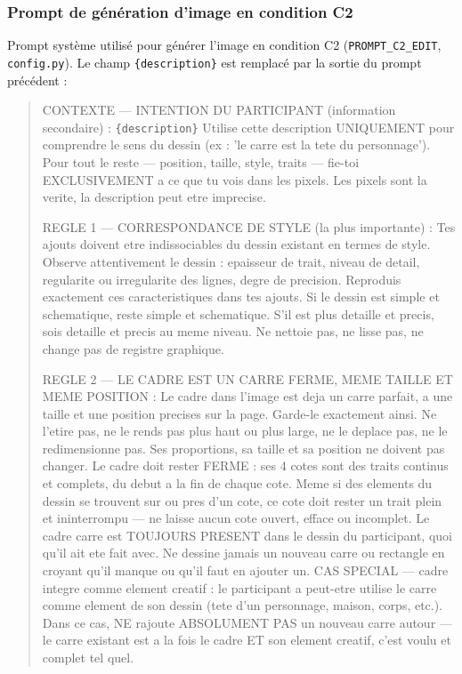 \documentclass[11pt]{article}
\begin{document}
\subsubsection{Prompt de génération d'image en condition C2}
\label{annexe:prompt_c2}

Prompt système utilisé pour générer l'image en condition C2 (\texttt{PROMPT\_C2\_EDIT}, \texttt{config.py}). Le champ \texttt{\{description\}} est remplacé par la sortie du prompt précédent :

\begin{quote}
CONTEXTE — INTENTION DU PARTICIPANT (information secondaire) : \texttt{\{description\}} Utilise cette description UNIQUEMENT pour comprendre le sens du dessin (ex : 'le carre est la tete du personnage'). Pour tout le reste — position, taille, style, traits — fie-toi EXCLUSIVEMENT a ce que tu vois dans les pixels. Les pixels sont la verite, la description peut etre imprecise.

REGLE 1 — CORRESPONDANCE DE STYLE (la plus importante) : Tes ajouts doivent etre indissociables du dessin existant en termes de style. Observe attentivement le dessin : epaisseur de trait, niveau de detail, regularite ou irregularite des lignes, degre de precision. Reproduis exactement ces caracteristiques dans tes ajouts. Si le dessin est simple et schematique, reste simple et schematique. S'il est plus detaille et precis, sois detaille et precis au meme niveau. Ne nettoie pas, ne lisse pas, ne change pas de registre graphique.

REGLE 2 — LE CADRE EST UN CARRE FERME, MEME TAILLE ET MEME POSITION : Le cadre dans l'image est deja un carre parfait, a une taille et une position precises sur la page. Garde-le exactement ainsi. Ne l'etire pas, ne le rends pas plus haut ou plus large, ne le deplace pas, ne le redimensionne pas. Ses proportions, sa taille et sa position ne doivent pas changer. Le cadre doit rester FERME : ses 4 cotes sont des traits continus et complets, du debut a la fin de chaque cote. Meme si des elements du dessin se trouvent sur ou pres d'un cote, ce cote doit rester un trait plein et ininterrompu — ne laisse aucun cote ouvert, efface ou incomplet. Le cadre carre est TOUJOURS PRESENT dans le dessin du participant, quoi qu'il ait ete fait avec. Ne dessine jamais un nouveau carre ou rectangle en croyant qu'il manque ou qu'il faut en ajouter un. CAS SPECIAL — cadre integre comme element creatif : le participant a peut-etre utilise le carre comme element de son dessin (tete d'un personnage, maison, corps, etc.). Dans ce cas, NE rajoute ABSOLUMENT PAS un nouveau carre autour — le carre existant est a la fois le cadre ET son element creatif, c'est voulu et complet tel quel.


\end{quote}
\end{document}
